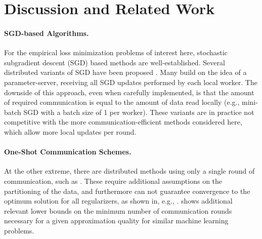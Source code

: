 \documentclass{article}
\newcommand{\0}{ {\bf 0}}
\theoremstyle{plain}
\theoremstyle{definition}
\begin{document}
{\section{Discussion and Related Work}
\label{sec:relatedWork}

\paragraph{SGD-based Algorithms.}
For the empirical loss minimization problems of interest here, stochastic subgradient descent (SGD) based methods are well-established.
Several distributed variants of SGD have been proposed \cite{Niu:2011wo,Liu:2014wj,Duchi:2013te}. Many build on the idea of a parameter-server, receiving all SGD updates performed by each local worker. The downside of this approach, even when carefully implemented, is that the amount of required communication is equal to the amount of data read locally (e.g., mini-batch SGD with a batch size of 1 per worker). These variants are in practice not competitive with the more communication-efficient methods considered here, which allow more local updates per round.


\vspace{-1em}
\paragraph{One-Shot Communication Schemes.}
At the other extreme, there are distributed methods using only a single round of communication, such as \cite{Zhang:2013wq, Zinkevich:2010tj,Mann:2009tr,McWilliams:2014tl}.
These require additional assumptions on the partitioning of the data, and furthermore can not guarantee convergence to the optimum solution for all regularizers, as shown in, e.g., \cite{DANE}. \cite{Balcan:2012tc} shows additional relevant lower bounds on the minimum number of communication rounds necessary for a given approximation quality for similar machine learning problems.

}
\end{document}
